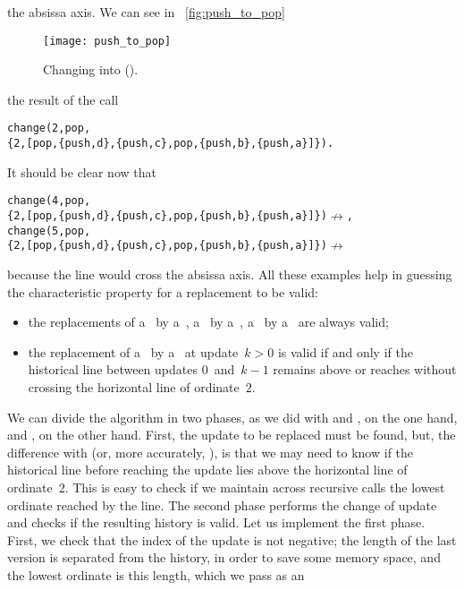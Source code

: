 the absissa axis. We can see in \fig~\vref{fig:push_to_pop}
\begin{figure}[!b]
\centering
\texttt{[image: push\_to\_pop]}
\caption{Changing  into 
  ().
\label{fig:push_to_pop}}
\end{figure}
the result of the call
\begin{alltt}
 change(2,pop,
        \{2,[pop,\{push,d\},\{push,c\},pop,\{push,b\},\{push,a\}]\}).
\end{alltt}
It should be clear now that
\begin{alltt}
change(4,pop,
      \{2,[pop,\{push,d\},\{push,c\},pop,\{push,b\},\{push,a\}]\})\(\nrightarrow\),
change(5,pop,
      \{2,[pop,\{push,d\},\{push,c\},pop,\{push,b\},\{push,a\}]\})\(\nrightarrow\)
\end{alltt}
because the line would cross the absissa axis. All these examples help
in guessing the characteristic property for a replacement to be valid:
\begin{itemize}

  \item the replacements of a~ by a~,
    a~ by a~, a~ by
    a~ are always valid;

  \item the replacement of a~ by a~ at
    update~\(k>0\) is valid if and only if the historical line between
    updates \(0\)~and~\(k-1\) remains above or reaches without
    crossing the horizontal line of ordinate~\(2\).

\end{itemize}
We can divide the algorithm in two phases, as we did with
 and , on the one hand, and
, on the other hand. First, the update to be replaced
must be found, but, the difference with  (or, more
accurately, ), is that we may need to know if the
historical line before reaching the update lies above the horizontal
line of ordinate~\(2\). This is easy to check if we maintain across
recursive calls the lowest ordinate reached by the line. The second
phase performs the change of update and checks if the resulting
history is valid. Let us implement the first phase. First, we check
that the index of the update is not negative; the length of the last
version is separated from the history, in order to save some memory
space, and the lowest ordinate is this length, which we pass as an
